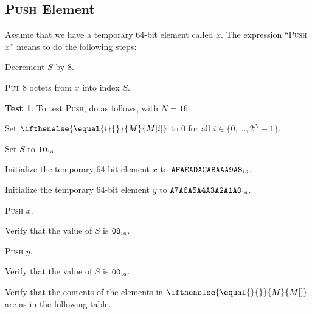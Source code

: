 \documentclass[a4paper,12pt]{article}
\newcommand{\num}[1]{\texttt{#1}}
\newcommand{\hex}[1]{\num{#1}_{\textup{\tiny 16}}}
\newcommand{\MEM}[1]{\ifthenelse{\equal{#1}{}}{M}{M[#1]}}
\newcommand{\SP}{S}
\newcommand{\range}[2]{\{#1,\ldots,#2\}}
\newcommand{\proc}[1]{\textsc{#1}}
\theoremstyle{definition}
\newtheorem{test}{Test}
\begin{document}
\subsection{\proc{Push} Element}

Assume that we have a temporary 64-bit element called $x$.
The expression ``\proc{Push} $x$'' means to do the following steps:
\begin{stepnumbers}
\item Decrement $\SP$ by 8.
\item \proc{Put} 8 octets from $x$ into index $\SP$.
\end{stepnumbers}

\begin{test}
  To test \proc{Push}, do as follows, with $N=16$:
  \begin{stepnumbers}
  \item Set $\MEM{i}$ to 0 for all $i \in \range{0}{2^N-1}$.
  \item Set $\SP$ to $\hex{10}$.
  \item Initialize the temporary 64-bit element $x$ to $\hex{AFAEADACABAAA9A8}$.
  \item Initialize the temporary 64-bit element $y$ to $\hex{A7A6A5A4A3A2A1A0}$.
  \item \proc{Push} $x$.
  \item Verify that the value of $\SP$ is $\hex{08}$.
  \item \proc{Push} $y$.
  \item Verify that the value of $\SP$ is $\hex{00}$.
  \item Verify that the contents of the elements in $\MEM{}$ are as in the following table.
  \end{stepnumbers}


\end{test}
\end{document}
